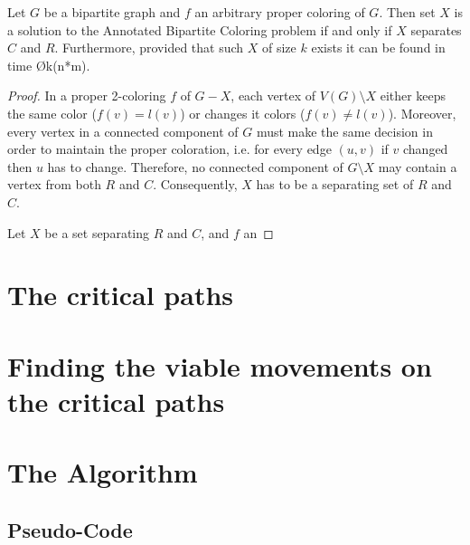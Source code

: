 \begin{lemma}\label{lemma:annotated-bipartite-coloring}
  Let $G$ be a bipartite graph and $f$ an arbitrary proper coloring of $G$.
  Then set $X$ is a solution to the Annotated Bipartite Coloring problem if and only if $X$ separates $C$ and $R$.
  Furthermore, provided that such $X$ of size $k$ exists it can be found in time \O{k(n*m)}.
\end{lemma}
\begin{proof}
  In a proper 2-coloring $f$ of $G-X$, each vertex of $V(G) \setminus X$ either keeps the same color ($f(v)=l(v)$) or changes it colors ($f(v) \neq l(v)$).
  Moreover, every vertex in a connected component of $G$ must make the same decision in order to maintain the proper coloration, i.e. for every edge $(u,v)$ if $v$ changed then $u$ has to change.
  Therefore, no connected component of $G \setminus X$ may contain a vertex from both $R$ and $C$.
  Consequently, $X$ has to be a separating set of $R$ and $C$.

  Let $X$ be a set separating $R$ and $C$, and $f$ an 
\end{proof}




\section{The critical paths}\label{sec:tcp}


\section{Finding the viable movements on the critical paths}\label{sec:path-movements}


\section{The Algorithm}

\subsection{Pseudo-Code}

